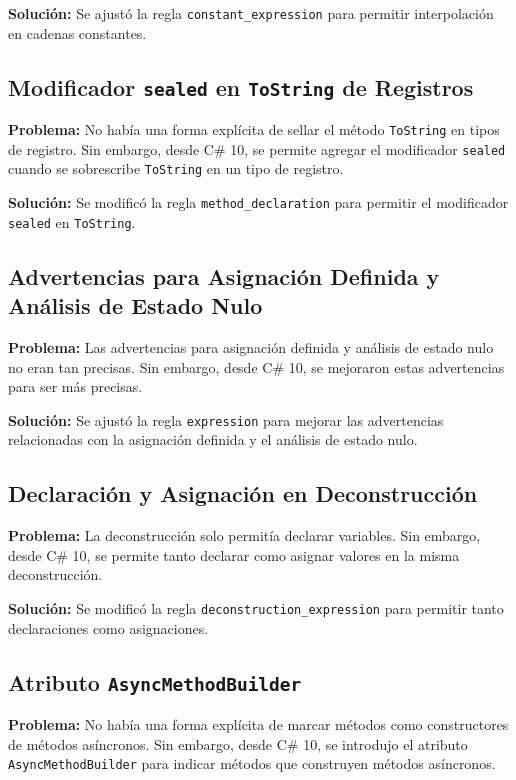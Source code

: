 \textbf{Solución:} Se ajustó la regla \texttt{constant\_expression} para permitir interpolación en cadenas constantes.

\subsection*{Modificador \texttt{sealed} en \texttt{ToString} de Registros}
\textbf{Problema:} No había una forma explícita de sellar el método \texttt{ToString} en tipos de registro. Sin embargo, desde C\# 10, se permite agregar el modificador \texttt{sealed} cuando se sobrescribe \texttt{ToString} en un tipo de registro.

\textbf{Solución:} Se modificó la regla \texttt{method\_declaration} para permitir el modificador \texttt{sealed} en \texttt{ToString}.

\subsection*{Advertencias para Asignación Definida y Análisis de Estado Nulo}
\textbf{Problema:} Las advertencias para asignación definida y análisis de estado nulo no eran tan precisas. Sin embargo, desde C\# 10, se mejoraron estas advertencias para ser más precisas.

\textbf{Solución:} Se ajustó la regla \texttt{expression} para mejorar las advertencias relacionadas con la asignación definida y el análisis de estado nulo.

\subsection*{Declaración y Asignación en Deconstrucción}
\textbf{Problema:} La deconstrucción solo permitía declarar variables. Sin embargo, desde C\# 10, se permite tanto declarar como asignar valores en la misma deconstrucción.

\textbf{Solución:} Se modificó la regla \texttt{deconstruction\_expression} para permitir tanto declaraciones como asignaciones.

\subsection*{Atributo \texttt{AsyncMethodBuilder}}
\textbf{Problema:} No había una forma explícita de marcar métodos como constructores de métodos asíncronos. Sin embargo, desde C\# 10, se introdujo el atributo \texttt{AsyncMethodBuilder} para indicar métodos que construyen métodos asíncronos.

